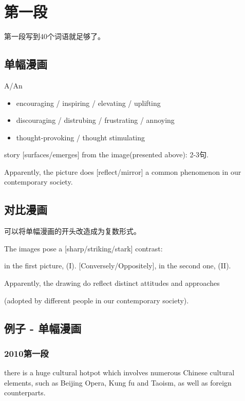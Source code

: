 \chapter{第一段}

第一段写到40个词语就足够了。

\section{单幅漫画}

A/An 

\begin{itemize}
    \item \colorbox{lime!40!white}{encouraging / inspiring / elevating / uplifting}
    \item \colorbox{magenta!40!white}{discouraging / distrubing / frustrating / annoying}
    \item \colorbox{cyan!40!white}{thought-provoking / thought stimulating}
\end{itemize}

\noindent story [surfaces/emerges] from the image(presented above):
2-3句.

\noindent Apparently, the picture does [reflect/mirror] a common phenomenon in our contemporary society.

\section{对比漫画}

可以将单幅漫画的开头改造成为复数形式。

The images pose a [sharp/striking/stark] contrast:

\noindent in the first picture, \textrm{(I)}.
[Conversely/Oppositely], in the second one, \textrm{(II)}.

\noindent Apparently, the drawing do reflect distinct attitudes and approaches 

\noindent (adopted by different people in our contemporary society).

\section{例子 - 单幅漫画}

\subsection{2010第一段}

there is a huge cultural hotpot which involves numerous 
Chinese cultural elements, such as Beijing Opera, Kung fu and Taoism, 
as well as foreign counterparts.

